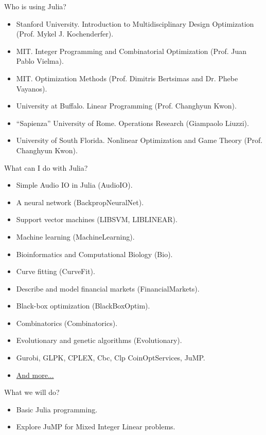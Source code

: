 \documentclass{beamer}
\begin{document}
\begin{frame}{Who is using Julia?}
  \begin{itemize}\footnotesize
  \item[] Stanford University. Introduction to Multidisciplinary Design Optimization (Prof. Mykel J. Kochenderfer).
  \item[] MIT. Integer Programming and Combinatorial Optimization (Prof. Juan Pablo Vielma).
  \item[] MIT. Optimization Methods (Prof. Dimitris Bertsimas and Dr. Phebe Vayanos).
  \item[] University at Buffalo. Linear Programming (Prof. Changhyun Kwon).
  \item[] “Sapienza” University of Rome. Operations Research (Giampaolo Liuzzi).
    \item[] University of South Florida. Nonlinear Optimization and Game Theory (Prof. Changhyun Kwon).
  \end{itemize}
\end{frame}


\begin{frame}{What can I do with Julia?}
  \begin{itemize}\footnotesize
  \item[] Simple Audio IO in Julia (AudioIO).
  \item[] A neural network (BackpropNeuralNet).
  \item[] Support vector machines (LIBSVM, LIBLINEAR).
  \item[] Machine learning (MachineLearning).
  \item[] Bioinformatics and Computational Biology (Bio).
  \item[] Curve fitting (CurveFit).
  \item[] Describe and model financial markets (FinancialMarkets).
  \item[] Black-box optimization (BlackBoxOptim).
  \item[] Combinatorics (Combinatorics).
  \item[] Evolutionary and genetic algorithms (Evolutionary).
  \item[] Gurobi, GLPK, CPLEX, Cbc, Clp CoinOptServices, JuMP.
  \item[] \href{http://pkg.julialang.org/}{And more...}
  \end{itemize}
\end{frame}

\begin{frame}{What we will do?}
  \begin{itemize}
  \item[] Basic Julia programming.
  \item[] Explore JuMP for Mixed Integer Linear problems.
  \end{itemize}
\end{frame}
\end{document}
